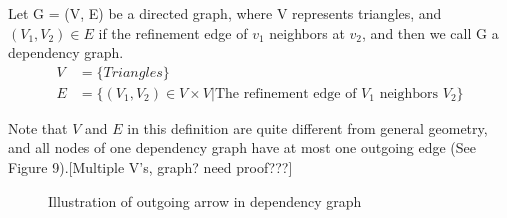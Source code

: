     \begin{definition*}
      Let G = (V, E) be a directed graph, where V represents triangles, and $(V_1, V_2)\in E$ if the refinement edge of $v_1$ neighbors at $v_2$, and then we call G a dependency graph.
      \begin{align*}
      V &= \{Triangles\}\\
      E &= \{(V_1, V_2)\in V\times V | \text{The refinement edge of $V_1$ neighbors $V_2$}\}
      \end{align*}
    \end{definition*}
    Note that $V$ and $E$ in this definition are quite different from general geometry, and all nodes of one dependency graph have at most one outgoing edge (See Figure 9).[Multiple V's, graph? need proof???]
    \begin{figure}[h!]
    \centering
    \caption{Illustration of outgoing arrow in dependency graph}
    \label{Figure 9}
    \end{figure}


